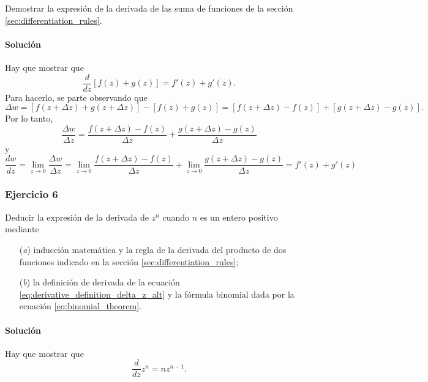\documentclass[a4paper]{report}
\begin{document}
Demostrar la expresión de la derivada de las suma de funciones de la sección \ref{sec:differentiation_rules}.

\paragraph{Solución} Hay que mostrar que 
\[
 \frac{d}{dz}[f(z)+g(z)]=f'(z)+g'(z).
\]
Para hacerlo, se parte observando que 
\[
 \Delta w=[f(z+\Delta z)+g(z+\Delta z)]-[f(z)+g(z)]=[f(z+\Delta z)-f(z)]+[g(z+\Delta z)-g(z)].
\]
Por lo tanto,
\[
 \frac{\Delta w}{\Delta z}=\frac{f(z+\Delta z)-f(z)}{\Delta z}+\frac{g(z+\Delta z)-g(z)}{\Delta z}
\]
y
\[
 \frac{dw}{dz}=\lim_{z\to0}\frac{\Delta w}{\Delta z}=\lim_{z\to0}\frac{f(z+\Delta z)-f(z)}{\Delta z}+\lim_{z\to0}\frac{g(z+\Delta z)-g(z)}{\Delta z}=f'(z)+g'(z)
\]

\subsubsection{Ejercicio 6}

Deducir la expresión de la derivada de \(z^n\) cuando \(n\) es un entero positivo mediante
\begin{enumerate}
 \item[(\textit{a})] inducción matemática y la regla de la derivada del producto de dos funciones indicado en la sección \ref{sec:differentiation_rules};
 \item[(\textit{b})] la definición de derivada de la ecuación \ref{eq:derivative_definition_delta_z_alt} y la fórmula binomial dada por la ecuación \ref{eq:binomial_theorem}.
\end{enumerate}

\paragraph{Solución}

Hay que mostrar que 
\[
 \frac{d}{dz}z^n=nz^{n-1}.
\]
\end{document}
